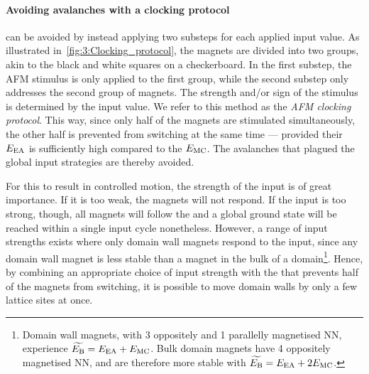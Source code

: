 \paragraph{Avoiding avalanches with a clocking protocol}
 can be avoided by instead applying two substeps for each applied input value.
As illustrated in~\cref{fig:3:Clocking_protocol}, the magnets are divided into two groups, akin to the black and white squares on a checkerboard.
In the first substep, the AFM stimulus is only applied to the first group, while the second substep only addresses the second group of magnets.
The strength and/or sign of the stimulus is determined by the input value.
We refer to this method as the \emph{AFM clocking protocol}.
This way, since only half of the magnets are stimulated simultaneously, the other half is prevented from switching at the same time --- provided their  $E_\mathrm{EA}$ is sufficiently high compared to the $E_\mathrm{MC}$.
The avalanches that plagued the global input strategies are thereby avoided. \par
For this to result in controlled  motion, the strength of the input is of great importance.
If it is too weak, the magnets will not respond.
If the input is too strong, though, all magnets will follow the  and a global ground state will be reached within a single input cycle nonetheless.
However, a range of input strengths exists where only domain wall magnets respond to the input, since any domain wall magnet is less stable than a magnet in the bulk of a domain\footnote{
	Domain wall magnets, with 3 oppositely and 1 parallelly magnetised NN, experience $\widetilde{E_\mathrm{B}} = E_\mathrm{EA} + E_\mathrm{MC}$.
	Bulk domain magnets have 4 oppositely magnetised NN, and are therefore more stable with $\widetilde{E_\mathrm{B}} = E_\mathrm{EA} + 2E_\mathrm{MC}$.
}.
Hence, by combining an appropriate choice of input strength with the  that prevents half of the magnets from switching, it is possible to move domain walls by only a few lattice sites at once. %


